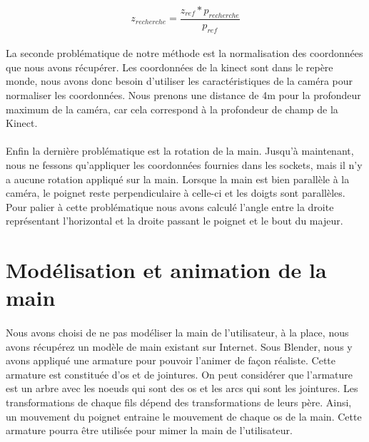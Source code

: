 \begin{equation}
 z_{recherche} = \frac{z_{ref} * p_{recherche}}{p_{ref}}
\end{equation}

\paragraph{}
La seconde problématique de notre méthode est la normalisation des coordonnées que nous avons récupérer. Les coordonnées
de la kinect sont dans le repère monde, nous avons donc besoin d'utiliser les caractéristiques de la caméra pour normaliser
les coordonnées. Nous prenons une distance de 4m pour la profondeur maximum de la caméra, car cela correspond à la profondeur 
de champ de la Kinect.

\paragraph{}
Enfin la dernière problématique est la rotation de la main. Jusqu'à maintenant, nous ne fessons qu'appliquer les coordonnées
fournies dans les sockets, mais il n'y a aucune rotation appliqué sur la main. Lorsque la main est bien parallèle à la caméra,
le poignet reste perpendiculaire à celle-ci et les doigts sont parallèles. Pour palier à cette problématique nous avons calculé
l'angle entre la droite représentant l'horizontal et la droite passant le poignet et le bout du majeur.


\section{Modélisation et animation de la main}
\paragraph{}
Nous avons choisi de ne pas modéliser la main de l'utilisateur, à la place, nous avons récupérez un modèle de main existant sur Internet.
Sous Blender, nous y avons appliqué une armature pour pouvoir l'animer de façon réaliste. Cette armature est constituée d'os et de jointures. On peut considérer que l'armature est un arbre avec les noeuds qui sont des os et les arcs qui sont les jointures. Les transformations de chaque fils dépend des transformations de leurs père. Ainsi, un mouvement du poignet entraine le mouvement de chaque os de la main. 
Cette armature pourra être utilisée pour mimer la main de l'utilisateur. 

